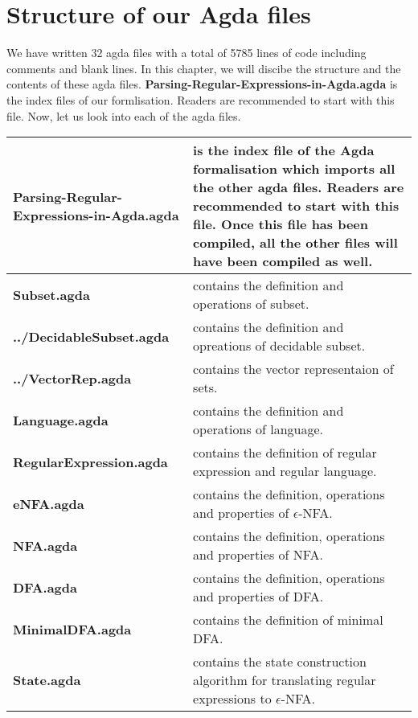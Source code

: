 \chapter{Structure of our Agda files}
\par We have written 32 agda files with a total of 5785 lines of
code including comments and blank lines. In this chapter, we will discibe the structure and the contents
of these agda files. \textbf{Parsing-Regular-Expressions-in-Agda.agda}
is the index files of our formlisation. Readers are recommended to
start with this file. Now, let us look into each of the agda files. 

\begin{center}
\begin{longtable}{| p{5.2cm} | p{8.3cm} |}
\hline
\textbf{Parsing-Regular-Expressions-in-Agda.agda} & is the index
file of the Agda formalisation which imports all the other agda
files. Readers are recommended to start with this file. Once this file
has been compiled, all the other files will have been compiled as
well. \\ \hline 
\textbf{Subset.agda} & contains the definition and operations of subset. \\
  \hline
\textbf{../DecidableSubset.agda} & contains the definition and opreations
                              of decidable subset. \\ \hline
\textbf{../VectorRep.agda} & contains the vector representaion of sets. \\
  \hline
\textbf{Language.agda} & contains the definition and operations of language. \\
  \hline 
\textbf{RegularExpression.agda} & contains the definition of regular expression
                         and regular language. \\ \hline
\textbf{eNFA.agda} & contains the definition, operations and properties of
       \(\epsilon\)-NFA. \\ \hline
\textbf{NFA.agda} & contains the definition, operations and properties of
       NFA. \\ \hline
\textbf{DFA.agda} & contains the definition, operations and properties of
       DFA. \\ \hline
\textbf{MinimalDFA.agda} & contains the definition of minimal DFA. \\
  \hline 
\textbf{State.agda} & contains the state construction algorithm for
                      translating regular expressions to
                      \(\epsilon\)-NFA. \\ \hline

\end{longtable}
\end{center}
